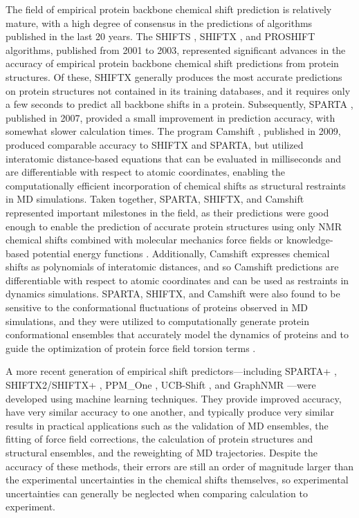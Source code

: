 \documentclass[9pt,review]{livecoms}
\begin{document}
The field of empirical protein backbone chemical shift prediction is relatively mature, with a high degree of consensus in the predictions of algorithms published in the last 20 years.
The SHIFTS \cite{xu_automated_2001}, SHIFTX \cite{neal_rapid_2003}, and PROSHIFT \cite{meiler_proshift_2003} algorithms, published from 2001 to 2003, represented significant advances in the accuracy of empirical protein backbone chemical shift predictions from protein structures.
Of these, SHIFTX generally produces the most accurate predictions on protein structures not contained in its training databases, and it requires only a few seconds to predict all backbone shifts in a protein.
Subsequently, SPARTA \cite{shen_protein_2007}, published in 2007, provided a small improvement in prediction accuracy, with somewhat slower calculation times.
The program Camshift \cite{kohlhoff_fast_2009}, published in 2009, produced comparable accuracy to SHIFTX and SPARTA, but utilized interatomic distance-based equations that can be evaluated in milliseconds and are differentiable with respect to atomic coordinates, enabling the computationally efficient incorporation of chemical shifts as structural restraints in MD simulations.
Taken together, SPARTA, SHIFTX, and Camshift represented important milestones in the field, as their predictions were good enough to enable the prediction of accurate protein structures using only NMR chemical shifts combined with molecular mechanics force fields or knowledge-based potential energy functions \cite{cavalli_protein_2007,shen_consistent_2008,wishart_cs23d_2008,robustelli_folding_2009,robustelli_using_2010}.
Additionally, Camshift expresses chemical shifts as polynomials of interatomic distances, and so Camshift predictions are differentiable with respect to atomic coordinates and can be used as restraints in dynamics simulations.
SPARTA, SHIFTX, and Camshift were also found to be sensitive to the conformational fluctuations of proteins observed in MD simulations, and they were utilized to computationally generate protein conformational ensembles that accurately model the dynamics of proteins \cite{li_certification_2010,markwick_enhanced_2010,robustelli_interpreting_2012,robustelli_conformational_2013} and to guide the optimization of protein force field torsion terms \cite{li_nmr-based_2010,robustelli_developing_2018}.

A more recent generation of empirical shift predictors---including SPARTA+ \cite{shen_sparta_2010}, SHIFTX2/SHIFTX+ \cite{han_shiftx2_2011}, PPM\_One \cite{li_ppm_one_2015}, UCB-Shift \cite{li_accurate_2020}, and GraphNMR \cite{yang_predicting_2021}---were developed using machine learning techniques.
They provide improved accuracy, have very similar accuracy to one another, and typically produce very similar results in practical applications such as the validation of MD ensembles, the fitting of force field corrections, the calculation of protein structures and structural ensembles, and the reweighting of MD trajectories.
Despite the accuracy of these methods, their errors are still an order of magnitude larger than the experimental uncertainties in the chemical shifts themselves, so experimental uncertainties can generally be neglected when comparing calculation to experiment.
\end{document}
